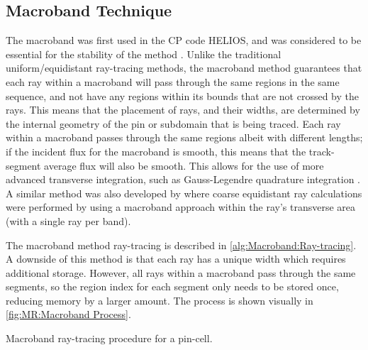 {{    \subsection{Macroband Technique}{\label{ssec:MR:Macroband Technique}
      The macroband was first used in the \acf{CP} code HELIOS, and was considered to be essential for the stability of the method \cite{Villarino1992}.
      Unlike the traditional uniform/equidistant ray-tracing methods, the macroband method guarantees that each ray within a macroband will pass through the same regions in the same sequence, and not have any regions within its bounds that are not crossed by the rays.
      This means that the placement of rays, and their widths, are determined by the internal geometry of the pin or subdomain that is being traced.
      Each ray within a macroband passes through the same regions albeit with different lengths; if the incident flux for the macroband is smooth, this means that the track-segment average flux will also be smooth.
      This allows for the use of more advanced transverse integration, such as Gauss-Legendre quadrature integration \cite{Yamamoto2005}.
      A similar method was also developed by \citet{Fevotte2007} where coarse equidistant ray calculations were performed by using a macroband approach within the ray's transverse area (with a single ray per band).

      The macroband method ray-tracing is described in \cref{alg:Macroband:Ray-tracing}.
      A downside of this method is that each ray has a unique width which requires additional storage.
      However, all rays within a macroband pass through the same segments, so the region index for each segment only needs to be stored once, reducing memory by a larger amount.
      The process is shown visually in \cref{fig:MR:Macroband Process}.

      \begin{algorithm}[ht]
        \centering
        \caption{Macroband ray-tracing procedure for a pin-cell.\label{alg:Macroband:Ray-tracing}}
        \begin{algorithmic}[1]
          \EndFor
        \end{algorithmic}
      \end{algorithm}

}}}
